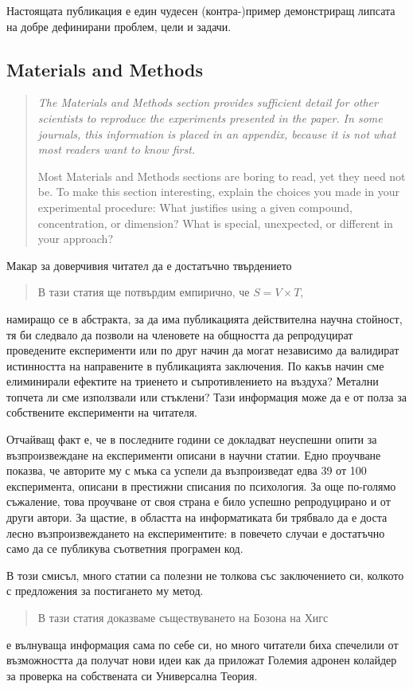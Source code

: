 \documentclass[11pt, oneside]{article}     %
\newenvironment{quotenature}{\begin{quote}\itshape}{\cite{nature}\end{quote}}
\begin{document}
Настоящата публикация е един чудесен (контра-)пример демонстриращ липсата на добре дефинирани проблем, цели и задачи.

\subsection*{Materials and Methods}

\begin{quotenature}
  The Materials and Methods section provides sufficient detail for other scientists to reproduce the experiments presented in the paper. In some journals, this information is placed in an appendix, because it is not what most readers want to know first.
  
  Most Materials and Methods sections are boring to read, yet they
  need not be. To make this section interesting, explain the choices
  you made in your experimental procedure: What justifies using a
  given compound, concentration, or dimension? What is special,
  unexpected, or different in your approach?
\end{quotenature}

Макар за доверчивия читател да е достатъчно твърдението

\begin{quotation}
  В тази статия ще потвърдим емпирично, че $S=V \times T$,
\end{quotation}
намиращо се в абстракта, за да има публикацията действителна научна стойност, тя би следвало да позволи на членовете на общността да репродуцират проведените експерименти или по друг начин да могат независимо да валидират истинността на направените в публикацията заключения. По какъв начин сме елиминирали ефектите на триенето и съпротивлението на въздуха? Метални топчета ли сме използвали или стъклени? Тази информация може да е от полза за собствените експерименти на читателя.

Отчайващ факт е, че в последните години се докладват неуспешни опити за възпроизвеждане на експерименти описани в научни статии. Едно проучване \cite{reproduce} показва, че авторите му с мъка са успели да възпроизведат едва 39 от 100 експеримента, описани в престижни списания по психология. За още по-голямо съжаление, това проучване от своя страна е било успешно репродуцирано и от други автори. За щастие, в областта на информатиката би трябвало да е доста лесно възпроизвеждането на експериментите: в повечето случаи е достатъчно само да се публикува съответния програмен код.

В този смисъл, много статии са полезни не толкова със заключението си, колкото с предложения за постигането му метод.
\begin{quote}
  В тази статия доказваме съществуването на Бозона на Хигс
\end{quote}
е вълнуваща информация сама по себе си, но много читатели биха спечелили от възможността да получат нови идеи как да приложат Големия адронен колайдер за проверка на собствената си Универсална Теория.
\end{document}
